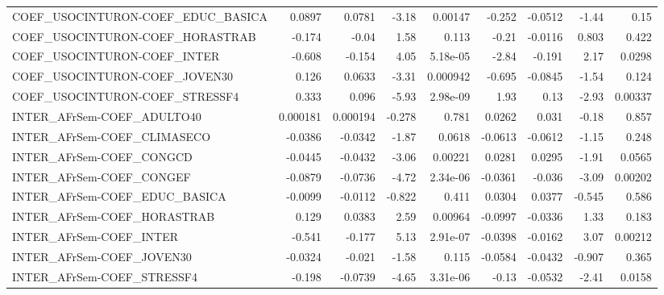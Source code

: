 \begin{tabular}{lrrrrrrrr}
COEF\_USOCINTURON-COEF\_EDUC\_BASICA     &      0.0897 &       0.0781 &   -3.18 &  0.00147 &     -0.252 &     -0.0512 &        -1.44 &          0.15 \\
COEF\_USOCINTURON-COEF\_HORASTRAB       &      -0.174 &        -0.04 &    1.58 &    0.113 &      -0.21 &     -0.0116 &        0.803 &         0.422 \\
COEF\_USOCINTURON-COEF\_INTER           &      -0.608 &       -0.154 &    4.05 & 5.18e-05 &      -2.84 &      -0.191 &         2.17 &        0.0298 \\
COEF\_USOCINTURON-COEF\_JOVEN30         &       0.126 &       0.0633 &   -3.31 & 0.000942 &     -0.695 &     -0.0845 &        -1.54 &         0.124 \\
COEF\_USOCINTURON-COEF\_STRESSF4        &       0.333 &        0.096 &   -5.93 & 2.98e-09 &       1.93 &        0.13 &        -2.93 &       0.00337 \\
INTER\_AFrSem-COEF\_ADULTO40            &    0.000181 &     0.000194 &  -0.278 &    0.781 &     0.0262 &       0.031 &        -0.18 &         0.857 \\
INTER\_AFrSem-COEF\_CLIMASECO           &     -0.0386 &      -0.0342 &   -1.87 &   0.0618 &    -0.0613 &     -0.0612 &        -1.15 &         0.248 \\
INTER\_AFrSem-COEF\_CONGCD              &     -0.0445 &      -0.0432 &   -3.06 &  0.00221 &     0.0281 &      0.0295 &        -1.91 &        0.0565 \\
INTER\_AFrSem-COEF\_CONGEF              &     -0.0879 &      -0.0736 &   -4.72 & 2.34e-06 &    -0.0361 &      -0.036 &        -3.09 &       0.00202 \\
INTER\_AFrSem-COEF\_EDUC\_BASICA         &     -0.0099 &      -0.0112 &  -0.822 &    0.411 &     0.0304 &      0.0377 &       -0.545 &         0.586 \\
INTER\_AFrSem-COEF\_HORASTRAB           &       0.129 &       0.0383 &    2.59 &  0.00964 &    -0.0997 &     -0.0336 &         1.33 &         0.183 \\
INTER\_AFrSem-COEF\_INTER               &      -0.541 &       -0.177 &    5.13 & 2.91e-07 &    -0.0398 &     -0.0162 &         3.07 &       0.00212 \\
INTER\_AFrSem-COEF\_JOVEN30             &     -0.0324 &       -0.021 &   -1.58 &    0.115 &    -0.0584 &     -0.0432 &       -0.907 &         0.365 \\
INTER\_AFrSem-COEF\_STRESSF4            &      -0.198 &      -0.0739 &   -4.65 & 3.31e-06 &      -0.13 &     -0.0532 &        -2.41 &        0.0158 \\

\end{tabular}
